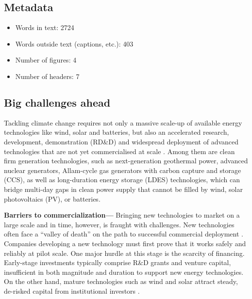 \documentclass[pdflatex,sn-basic, Numbered]{sn-jnl}
\theoremstyle{thmstyleone}%
\theoremstyle{thmstyletwo}%
\theoremstyle{thmstylethree}%
\begin{document}
\subsection*{Metadata}
\begin{itemize}
    \item Words in text: 2724
    \item Words outside text (captions, etc.): 403
    \item Number of figures: 4
    \item Number of headers: 7
\end{itemize}



\maketitle

\subsection*{Big challenges ahead}\label{sec1}

Tackling climate change requires not only a massive scale-up of available energy technologies like wind, solar and batteries, but also an accelerated research, development, demonstration (RD\&D) and widespread deployment of advanced technologies that are not yet commercialised at scale \cite{sepulvedaRoleFirmLowCarbon2018, bistlineImpactCarbonDioxide2021, brownUltralongdurationEnergyStorage2023, ieaNetZero20502021}.
Among them are clean firm generation technologies, such as next-generation geothermal power, advanced nuclear generators, Allam-cycle gas generators with carbon capture and storage (CCS), as well as long-duration energy storage (LDES) technologies, which can bridge multi-day gaps in clean power supply that cannot be filled by wind, solar photovoltaics (PV), or batteries.

\textbf{Barriers to commercialization---} Bringing new technologies to market on a large scale and in time, however, is fraught with challenges.
New technologies often face a \enquote{valley of death} on the path to successful commercial deployment \cite{gatesFinancingCleanIndustrial2021, google-advancedtech}.
Companies developing a new technology must first prove that it works safely and reliably at pilot scale.
One major hurdle at this stage is the scarcity of financing. Early-stage investments typically comprise R\&D grants and venture capital, insufficient in both magnitude and duration to support new energy technologies. On the other hand, mature technologies such as wind and solar attract steady, de-risked capital from institutional investors \cite{google-advancedtech, khatcherianBarriersTimelyDeployment2022}.
\end{document}
